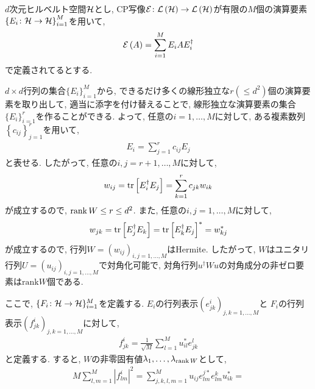 \begin{ex}
    \label{ex8.10}
    $d$次元ヒルベルト空間$\mathcal{H}$とし, CP写像$\mathcal{E} \colon \mathcal{L}\left({\mathcal{H}}\right) \to \mathcal{L}\left({\mathcal{H}}\right)$が有限の$M$個の演算要素$\left\{ E_i \colon \mathcal{H} \to \mathcal{H} \right\}_{i = 1}^{M}$を用いて, 
    \begin{align*}
        \mathcal{E} \left( A\right) = \sum_{i=1}^M E_i A E_i^\dagger
    \end{align*}
    で定義されてるとする. 
    \par
    $d \times d$行列の集合$\{E_i\}_{i=1}^{M}$から, できるだけ多くの線形独立な$r \left(\le d^2\right)$個の演算要素を取り出して, 適当に添字を付け替えることで, 線形独立な演算要素の集合$\{E_i\}_{i=1}^{r}$を作ることができる. 
    よって, 任意の$i= 1, \dots , M$に対して, ある複素数列$\left\{ c_{ij} \right\}_{j=1}^{r}$を用いて,
    \begin{align*}
        E_i = \sum_{j=1}^{r} c_{ij} E_j
    \end{align*}
    と表せる.
    したがって, 任意の$i, j = r+1 , \dots, M$に対して,
    \begin{align*}
        w_{ij} = \mathrm{tr}\left[E_i^\dagger E_j\right] = \sum_{k=1}^{r} c_{jk} w_{ik}
    \end{align*}
    が成立するので, $\operatorname{rank} W \leq r \leq d^2$. 
    また, 任意の$i, j = 1 , \dots, M$に対して, 
    \begin{align*}
        w_{jk} = \mathrm{tr}\left[ E_j^\dagger E_k\right]= \mathrm{tr}\left[ E_k^\dagger E_j\right]^*
        = w_{kj}^*
    \end{align*}
    が成立するので, 行列$W = \left(w_{ij}\right)_{i,j = 1, \dots , M}$はHermite.  したがって, $W$はユニタリ行列$U = \left(u_{ij}\right)_{i,j = 1, \dots , M}$で対角化可能で, 対角行列$u^\dagger W u$の対角成分の非ゼロ要素は$\mathrm{rank}W$個である.
    \par
    ここで, $\{F_i \colon \mathcal{H} \to \mathcal{H} \}_{i=1}^{M}$を定義する. 
    $E_{i}$の行列表示$\left( e^{i}_{jk} \right)_{j,k=1,\dots,M}$と
    $F_{i}$の行列表示$\left( f^{i}_{jk} \right)_{j,k=1,\dots,M}$に対して, 
    \begin{align*}
        f_{jk}^{i} = \frac{1}{\sqrt{M}} \sum_{l = 1}^M u_{il}^* e^l_{jk}
    \end{align*}
    と定義する.
    すると, $W$の非零固有値$\lambda_1, \dots , \lambda_{\operatorname{rank} W}$として, 
    \begin{align*}
        M \sum_{l,m=1}^M
        \left| f_{lm}^{i} \right|^2
        =
        \sum_{j,k,l,m=1}^M
        u_{ij} e_{lm}^{j*} e_{lm}^k u_{ik}^*
        =

\end{align*}
\end{ex}
